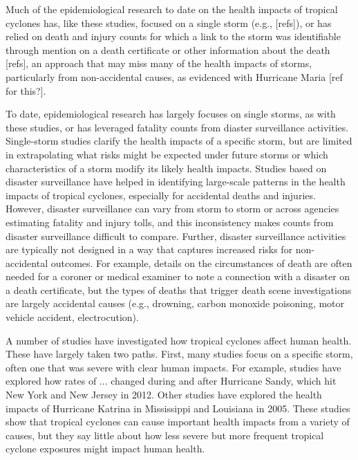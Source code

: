 Much of the
epidemiological research to date on the health impacts of tropical cyclones has, like these studies,
focused on a single storm (e.g., [refs]), or has relied on death and injury
counts for which a link to the storm was identifiable through mention on a
death certificate or other information about the death [refs], an approach that
may miss many of the health impacts of storms, particularly from non-accidental
causes, as evidenced with Hurricane Maria [ref for this?]. 

To date, epidemiological research has largely focuses on single storms, as with
these studies, or has leveraged fatality counts from diaster surveillance
activities. Single-storm studies clarify the health impacts of a specific
storm, but are limited in extrapolating what risks might be expected under
future storms or which characteristics of a storm modify its likely health
impacts.  Studies based on disaster surveillance have helped in identifying
large-scale patterns in the health impacts of tropical cyclones, especially for
accidental deaths and injuries. However, disaster surveillance can vary from
storm to storm or across agencies estimating fatality and injury tolls, and
this inconsistency makes counts from disaster surveillance difficult to
compare. Further, disaster surveillance activities are typically not 
designed in a way that captures increased risks for non-accidental outcomes. 
For example, details on the circumstances of death are often needed for 
a coroner or medical examiner to note a connection with a disaster on a 
death certificate, but the types of deaths that trigger death scene investigations
are largely accidental causes (e.g., drowning, carbon monoxide poisoning, 
motor vehicle accident, electrocution).    

A number of studies have investigated how tropical cyclones affect human
health. These have largely taken two paths. First, many studies focus on a
specific storm, often one that was severe with clear human impacts. For
example, studies have explored how rates of ... changed during and after
Hurricane Sandy, which hit New York and New Jersey in 2012. 
Other studies have explored the health impacts of Hurricane Katrina in 
Mississippi and Louisiana in 2005. These studies show that tropical cyclones
can cause important health impacts from a variety of causes, but they say 
little about how less severe but more frequent tropical cyclone exposures 
might impact human health.  

